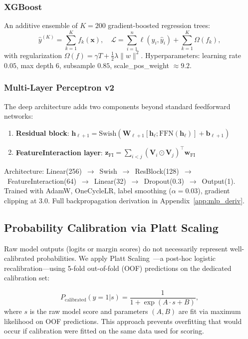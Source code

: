 \documentclass[12pt, a4paper]{article}
\begin{document}
\subsubsection{XGBoost}

An additive ensemble of $K = 200$ gradient-boosted regression trees:
\begin{equation}\label{eq:xgb}
\hat{y}^{(K)} = \sum_{k=1}^{K} f_k(\mathbf{x}), \quad
\mathcal{L} = \sum_{i=1}^{n} \ell(y_i, \hat{y}_i) + \sum_{k=1}^{K} \Omega(f_k),
\end{equation}
with regularization $\Omega(f) = \gamma T + \tfrac{1}{2}\lambda \|w\|^2$. Hyperparameters: learning rate $0.05$, max depth $6$, subsample $0.85$, scale\_pos\_weight ${\approx}9.2$.

\subsubsection{Multi-Layer Perceptron v2}

The deep architecture adds two components beyond standard feedforward networks:

\begin{enumerate}[label=(\alph*)]
    \item \textbf{Residual block}: $\mathbf{h}_{\ell+1} = \text{Swish}(\mathbf{W}_{\ell+1} [\mathbf{h}_\ell; \text{FFN}(\mathbf{h}_\ell)] + \mathbf{b}_{\ell+1})$
    \item \textbf{FeatureInteraction layer}: $\mathbf{z}_{\text{FI}} = \sum_{i<j} (\mathbf{V}_i \odot \mathbf{V}_j)^\top \mathbf{w}_{\text{FI}}$
\end{enumerate}

Architecture: Linear(256)~$\to$~Swish~$\to$~ResBlock(128)~$\to$~FeatureInteraction(64)~$\to$~Linear(32)~$\to$~Dropout(0.3)~$\to$~Output(1). Trained with AdamW, OneCycleLR, label smoothing ($\alpha = 0.03$), gradient clipping at $3.0$. Full backpropagation derivation in Appendix~\ref{app:mlp_deriv}.

\subsection{Probability Calibration via Platt Scaling}

Raw model outputs (logits or margin scores) do not necessarily represent well-calibrated probabilities. We apply Platt Scaling~\cite{platt1999}---a post-hoc logistic recalibration---using 5-fold out-of-fold (OOF) predictions on the dedicated calibration set:

\begin{equation}\label{eq:platt}
P_{\text{calibrated}}(y=1|s) = \frac{1}{1 + \exp(A \cdot s + B)},
\end{equation}
where $s$ is the raw model score and parameters $(A, B)$ are fit via maximum likelihood on OOF predictions. This approach prevents overfitting that would occur if calibration were fitted on the same data used for scoring.
\end{document}
